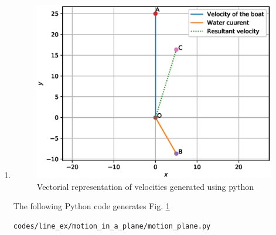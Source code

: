\begin{enumerate}
\item \begin{figure}[!ht]
\centering
\includegraphics[width=\columnwidth]{./figs/line_ex/motion_in_a_plane/motion_plane.eps}
\caption{Vectorial representation of velocities generated using python}
\label{fig:motion_plane_motion_in_a_plane}
\end{figure} 

The following Python code generates Fig. \ref{fig:motion_plane_motion_in_a_plane}

\begin{lstlisting}
codes/line_ex/motion_in_a_plane/motion_plane.py
\end{lstlisting}

\end{enumerate}